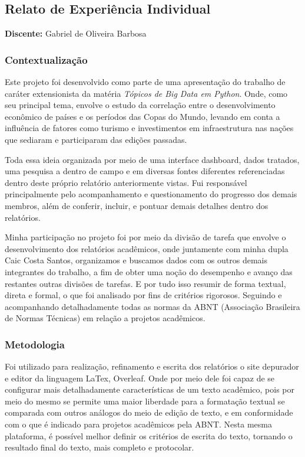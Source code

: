 \documentclass[12pt, a4paper, brazil]{article}
\begin{document}
\subsection{Relato de Experiência Individual}
\textbf{Discente:} Gabriel de Oliveira Barbosa

\subsubsection{Contextualização}
Este projeto foi desenvolvido como parte de uma apresentação do trabalho de caráter extensionista da matéria \textit{Tópicos de Big Data em Python}. Onde, como seu principal tema, envolve o estudo da correlação entre o desenvolvimento econômico de países e os períodos das Copas do Mundo, levando em conta a influência de fatores como turismo e investimentos em infraestrutura nas nações que sediaram e participaram das edições passadas. 

Toda essa ideia organizada por meio de uma interface dashboard, dados tratados, uma pesquisa a dentro de campo e em diversas fontes diferentes referenciadas dentro deste próprio relatório anteriormente vistas. Fui responsável principalmente pelo acompanhamento e questionamento do progresso dos demais membros, além de conferir, incluir, e pontuar demais detalhes dentro dos relatórios.

Minha participação no projeto foi por meio da divisão de tarefa que envolve o desenvolvimento dos relatórios acadêmicos, onde juntamente com minha dupla Caic Costa Santos, organizamos e buscamos dados com os outros demais integrantes do trabalho, a fim de obter uma noção do desempenho e avanço das restantes outras divisões de tarefas. E por tudo isso resumir de forma textual, direta e formal, o que foi analisado por fins de critérios rigorosos. Seguindo e acompanhando detalhadamente todas as normas da ABNT (Associação Brasileira de Normas Técnicas) em relação a projetos acadêmicos. 

\subsubsection{Metodologia}
Foi utilizado para realização, refinamento e escrita dos relatórios o site depurador e editor da linguagem LaTex, Overleaf. Onde por meio dele foi capaz de se configurar mais detalhadamente características de um texto acadêmico, pois por meio do mesmo se permite uma maior liberdade para a formatação textual se comparada com outros análogos do meio de edição de texto, e em conformidade com o que é indicado para projetos acadêmicos pela ABNT. Nesta mesma plataforma, é possível melhor definir os critérios de escrita do texto, tornando o resultado final do texto, mais completo e protocolar.
\end{document}
